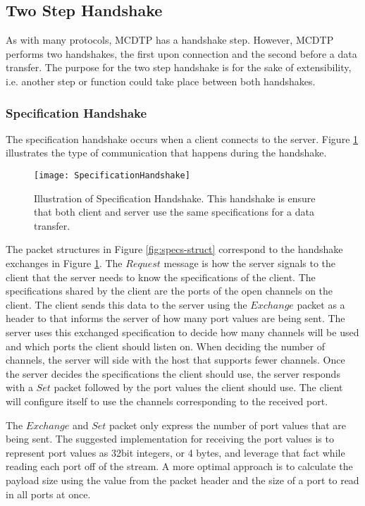 \subsection{Two Step Handshake}

As with many protocols, MCDTP has a handshake step. However, MCDTP performs two handshakes, the first upon connection and the second before a data transfer. The purpose for the two step handshake is for the sake of extensibility, i.e. another step or function could take place between both handshakes.

\subsubsection{Specification Handshake}

The specification handshake occurs when a client connects to the server. Figure \ref{fig:specs} illustrates the type of communication that happens during the handshake.

\begin{figure}[ht]
\centering
\texttt{[image: SpecificationHandshake]}
\caption{Illustration of Specification Handshake. This handshake is ensure that both client and server use the same specifications for a data transfer.}
\label{fig:specs}
\end{figure}

The packet structures in Figure \ref{fig:specs-struct} correspond to the handshake exchanges in Figure \ref{fig:specs}. The $Request$ message is how the server signals to the client that the server needs to know the specifications of the client. The specifications shared by the client are the ports of the open channels on the client. The client sends this data to the server using the $Exchange$ packet as a header to that informs the server of how many port values are being sent. The server uses this exchanged specification to decide how many channels will be used and which ports the client should listen on. When deciding the number of channels, the server will side with the host that supports fewer channels. Once the server decides the specifications the client should use, the server responds with a $Set$ packet followed by the port values the client should use. The client will configure itself to use the channels corresponding to the received port.

The $Exchange$ and $Set$ packet only express the number of port values that are being sent. The suggested implementation for receiving the port values is to represent port values as 32bit integers, or 4 bytes, and leverage that fact while reading each port off of the stream. A more optimal approach is to calculate the payload size using the value from the packet header and the size of a port to read in all ports at once.

